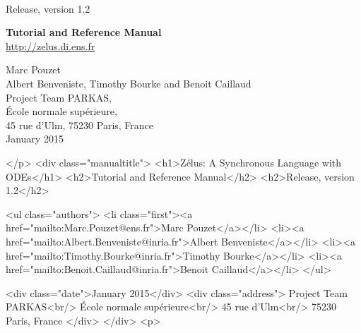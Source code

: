 \documentclass[11pt,titlepage,twoside]{report}
\begin{document}
\pagestyle{empty}

\vfill

\\[2ex]
{\Large Release, version 1.2}


\vspace{7cm}

\begin{center}
{\Huge \bf Tutorial and Reference Manual} \\

\vspace{1cm}
{\Large \url{http://zelus.di.ens.fr}}
\vspace{1.5cm}

{\Large Marc Pouzet} \\[2ex]
{\Large Albert Benveniste, Timothy Bourke and Benoit Caillaud} \\[4ex]
{\large Project Team PARKAS, \\
\'Ecole normale sup\'erieure, \\ 45 rue d'Ulm,
75230 Paris, France} \\[2ex]
{\Large January 2015} \\

\end{center}
\begin{rawhtml}
</p>
<div class="manualtitle">
  <h1>Zélus: A Synchronous Language with ODEs</h1>
  <h2>Tutorial and Reference Manual</h2>
  <h2>Release, version 1.2</h2>

  <ul class="authors">
    <li class="first"><a href="mailto:Marc.Pouzet@ens.fr">Marc Pouzet</a></li>
    <li><a href="mailto:Albert.Benveniste@inria.fr">Albert Benveniste</a></li>
    <li><a href="mailto:Timothy.Bourke@inria.fr">Timothy Bourke</a></li>
    <li><a href="mailto:Benoit.Caillaud@inria.fr">Benoit Caillaud</a></li>
  </ul>

  <div class="date">January 2015</div>
  <div class="address">
    Project Team PARKAS<br/>
    École normale supérieure<br/>
    45 rue d'Ulm<br/>
    75230 Paris, France
  </div>
</div>
<p>
\end{rawhtml}

\newpage
\cleardoublepage
\tableofcontents
\cleardoublepage
\end{document}

